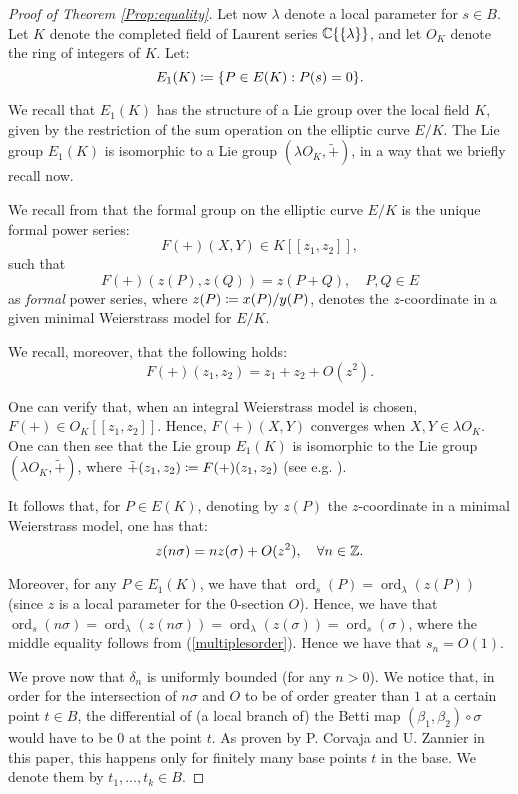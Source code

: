 \documentclass[a4paper,12pt]{article}
\theoremstyle{remark}
\DeclareMathOperator{\ord}{ord}
\begin{document}
\begin{proof}[Proof of Theorem \ref{Prop:equality}]
	Let now $\lambda$ denote a local parameter for $s \in B$. Let $K$ denote the completed field of Laurent series $\mathbb C\{\{\lambda\}\}$, and let $O_K$ denote the ring of integers of $K$. Let:
	\[
	E_1(K)\coloneqq \{P \in E(K):P(s)=0\}.
	\]
	
	We recall that $E_1(K)$ has the structure of a Lie group over the local field $K$, given by the restriction of the sum operation on the elliptic curve $E/K$. The Lie group $E_1(K)$ is isomorphic to a Lie group $(\lambda O_K,\tilde{+})$, in a way that we briefly recall now.
	
	We recall from \cite[Chapter IV]{silverman} that the formal group on the elliptic curve $E/K$ is the unique formal power series:
	\[
	F(+)(X,Y) \in K[[z_1,z_2]],
	\]
	such that
	\[
	F(+)(z(P),z(Q))=z(P+Q), \quad P, Q \in E
	\]
	as \textit{formal} power series, where $z(P)\coloneqq x(P)/y(P)$, denotes the $z$-coordinate in a given minimal Weierstrass model for $E/K$. 
	
	We recall, moreover, that the following holds:
	\[
	F(+)(z_1,z_2)=z_1+z_2+O(z^2).
	\]
	
	One can verify that, when an integral Weierstrass model is chosen, $F(+) \in O_K[[z_1,z_2]]$. Hence, $F(+)(X,Y)$ converges when $X, Y \in \lambda O_K$. One can then see that the Lie group $E_1(K)$ is isomorphic to the Lie group $(\lambda O_K,\tilde{+})$, where $\tilde{+}(z_1,z_2)\coloneqq F(+)(z_1,z_2)$ (see e.g. \cite[Proposition VII.2.2]{silverman}).
	
	It follows that, for $P \in E(K)$, denoting by $z(P)$ the $z$-coordinate in a minimal Weierstrass model, one has that:
	\begin{equation}\label{multiplesorder}
	z(n\sigma)=nz(\sigma)+O(z^2), \quad \forall n\in \mathbb Z.
	\end{equation}
	
	Moreover, for any $P \in E_1(K)$, we have that $\ord_s(P)=\ord_{\lambda}(z(P))$ (since $z$ is a local parameter for the $0$-section $O$). Hence, we have that $\ord_s(n\sigma)=\ord_{\lambda}(z(n\sigma))=\ord_{\lambda}(z(\sigma))=\ord_s(\sigma)$, where the middle equality follows from (\ref{multiplesorder}). Hence we have that $s_n=O(1)$.
	
	
	We prove now that $\delta_n$ is uniformly bounded (for any $n>0$). We notice that, in order for the intersection of $n \sigma$ and $O$ to be of order greater than $1$ at a certain point $t \in B$, the differential of (a local branch of) the Betti map $(\beta_1,\beta_2)\circ \sigma$ would have to be $0$ at the point $t$. As proven by P. Corvaja and U. Zannier in this paper, this happens only for finitely many base points $t$ in the base. We denote them by $t_1,\dots, t_k  \in B$. 
	

\end{proof}
\end{document}
